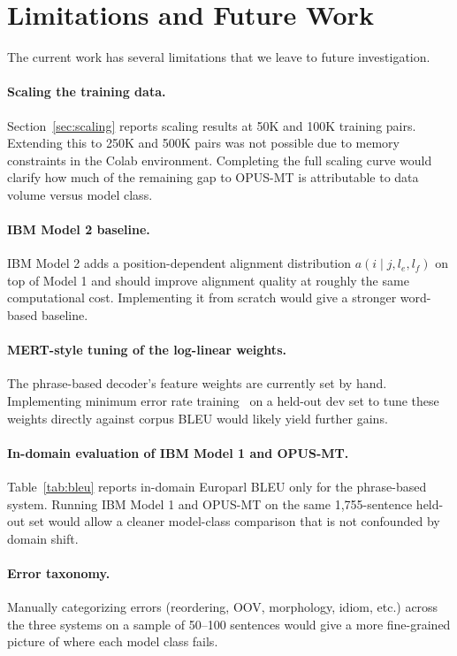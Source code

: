 \documentclass[11pt]{article}
\begin{document}
\section{Limitations and Future Work}
\label{sec:plan}

The current work has several limitations that we leave to future investigation.
 
\paragraph{Scaling the training data.} Section~\ref{sec:scaling} reports scaling results at 50K and 100K training pairs. Extending this to 250K and 500K pairs was not possible due to memory constraints in the Colab environment. Completing the full scaling curve would clarify how much of the remaining gap to OPUS-MT is attributable to data volume versus model class.

\paragraph{IBM Model 2 baseline.} IBM Model 2 adds a position-dependent alignment distribution $a(i \mid j, l_e, l_f)$ on top of Model 1 and should improve alignment quality at roughly the same computational cost. Implementing it from scratch would give a stronger word-based baseline.

\paragraph{MERT-style tuning of the log-linear weights.} The phrase-based decoder's feature weights are currently set by hand. Implementing minimum error rate training~\cite{och-2003-minimum} on a held-out dev set to tune these weights directly against corpus BLEU would likely yield further gains.

\paragraph{In-domain evaluation of IBM Model 1 and OPUS-MT.} Table~\ref{tab:bleu} reports in-domain Europarl BLEU only for the phrase-based system. Running IBM Model 1 and OPUS-MT on the same 1{,}755-sentence held-out set would allow a cleaner model-class comparison that is not confounded by domain shift.

\paragraph{Error taxonomy.} Manually categorizing errors (reordering, OOV, morphology, idiom, etc.) across the three systems on a sample of 50--100 sentences would give a more fine-grained picture of where each model class fails.
\end{document}
